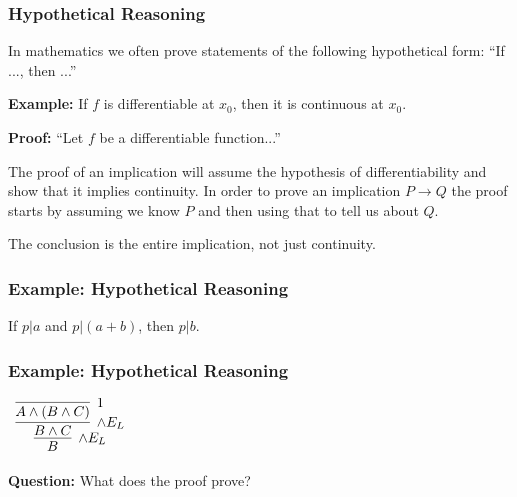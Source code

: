 \documentclass{beamer}
\theoremstyle{indentDefn} \newtheorem{defn}[]{Definition}
\begin{document}
\begin{frame}
	\frametitle{Hypothetical Reasoning}
	
	In mathematics we often prove statements of the following hypothetical form: ``If ..., then ...'' 
	
	\vspace{0.3cm}
	
	{\bf Example:} If $f$ is differentiable at $x_{0}$, then it is continuous at $x_{0}$.
	
	\vspace{0.3cm}

  	{\bf Proof:} ``Let $f$ be a differentiable function...''

  	\vspace{0.3cm}
	
	The proof of an implication will assume the hypothesis of differentiability and show that it implies continuity. In order to prove an implication $P \to Q$ the proof starts by assuming we know $P$ and then using that to tell us about $Q$. 
	
	\vspace{0.3cm} 
	
	The conclusion is the entire implication, not just continuity. 
	
	\vspace{1cm}
	
\end{frame}

\begin{frame}
\frametitle{Example: Hypothetical Reasoning}

	If $p | a$ and $p | (a + b)$, then $p | b$.

\vspace{6cm}	

\end{frame}

\begin{frame}
	\frametitle{Example: Hypothetical Reasoning}

	\begin{center}
		$\begin{array}{c}
			\infer[\land E_{L}]{B}
				{\infer[\land E_{L}]{B \land C}
					{\infer[1]{A \land (B \land C)}
						{}}}
		\end{array}$
	\end{center}

	\vspace{4cm}

	{\bf Question:} What does the proof prove?

\end{frame}
\end{document}
